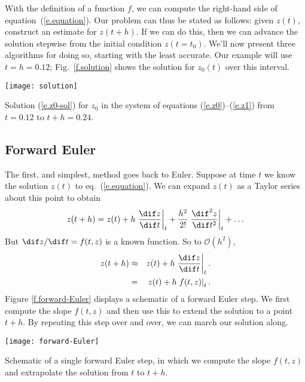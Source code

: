 With the definition of a function $f$, we can compute the right-hand side of equation~(\ref{e.equation}). Our problem can thus be stated as follows:
given $z(t)$, construct an estimate for $z(t+h)$. If we can do this, then we can advance the solution stepwise from the initial condition $z(t=t_{0})$. We'll now present three algorithms for doing so, starting with the least accurate. Our example will use $t=h=0.12$; Fig.~\ref{f.solution} shows the solution for $z_{0}(t)$ over this interval.
\begin{marginfigure}
\texttt{[image: solution]}
\caption[Solution for a sample set of ODE's]{\label{f.solution} Solution (\ref{e.z0-sol}) for $z_{0}$ in the system of equations (\ref{e.z0})--(\ref{e.z1}) from $t=0.12$ to $t+h=0.24$.}
\end{marginfigure}

\subsection{Forward Euler}

The first, and simplest, method goes back to Euler.
Suppose at time $t$ we know the solution $z(t)$ to eq.~(\ref{e.equation}). We can expand $z(t)$ as a Taylor series about this point to obtain
\[ z(t+h) = z(t) + h \left.\frac{\dif z}{\dif t}\right|_{t} + \frac{h^{2}}{2!} \left.\frac{\dif^{2} z}{\dif t^{2}}\right|_{t} + \ldots \]
But $\dif z/\dif t = f(t,z)$ is a known function. So to $\mathcal{O}(h^{2})$,
\begin{eqnarray}
	z(t+h) &\approx& z(t) + h \left.\frac{\dif z}{\dif t}\right|_{t}. \nonumber\\
		&=& z(t) + h \left.f(t,z)\right|_{t}.
\label{e.fEuler}
\end{eqnarray}
Figure \ref{f.forward-Euler} displays a schematic of a forward Euler step. We first compute the slope $f(t,z)$ and then use this to extend the solution to a point $t+h$. By repeating this step over and over, we can march our solution along.
\begin{marginfigure}
\texttt{[image: forward-Euler]}
\caption[Schematic of a single forward Euler step]{\label{f.forward-Euler}Schematic of a single forward Euler step, in which we compute the slope $f(t,z)$ and extrapolate the solution from $t$ to $t+h$.}
\end{marginfigure}

